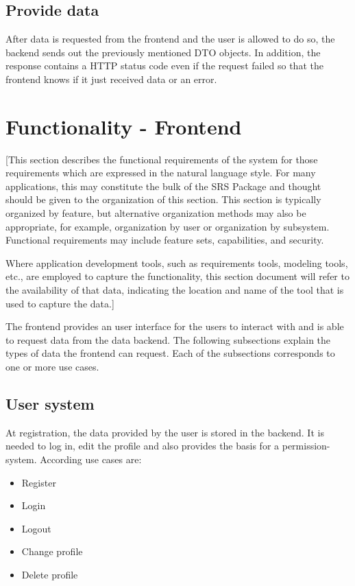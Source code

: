 \documentclass[a4paper,12pt,chapterprefix=false,bibliography=totoc,listof=totoc,]{scrreprt}
\begin{document}
\subsection{{\color{magenta} Provide data}}
{\color{magenta}
After data is requested from the frontend and the user is allowed to do so, the backend sends out the previously mentioned DTO objects. In addition, the response contains a HTTP status code even if the request failed so that the frontend knows if it just received data or an error.
}

\section{Functionality - Frontend}
{\color{blue} [This section describes the functional requirements of the system for those requirements which are expressed in the natural language style. For many applications, this may constitute the bulk of the SRS Package and thought should be given to the organization of this section. This section is typically organized by feature, but alternative organization methods may also be appropriate, for example, organization by user or organization by subsystem.  Functional requirements may include feature sets, capabilities, and security.

Where application development tools, such as requirements tools, modeling tools, etc., are employed to capture the functionality, this section document will refer to the availability of that data, indicating the location and name of the tool that is used to capture the data.]}

{\color{magenta}
The frontend provides an user interface for the users to interact with and is able to request data from the data backend. The following subsections explain the types of data the frontend can request. Each of the subsections corresponds to one or more use cases.
}


\subsection{{\color{magenta} User system}}
{\color{magenta}
At registration, the data provided by the user is stored in the backend. It is needed to log in, edit the profile and also provides the basis for a permission-system. According use cases are:

\begin{itemize}
    \item Register
    \item Login
    \item Logout
    \item Change profile
    \item Delete profile
\end{itemize}
}
\end{document}
